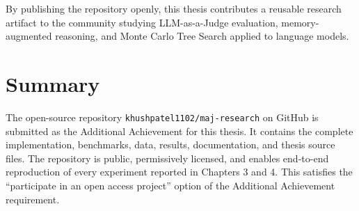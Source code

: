 \documentclass[12pt,a4paper]{article}
\begin{document}
By publishing the repository openly, this thesis contributes a reusable research artifact to the community studying LLM-as-a-Judge evaluation, memory-augmented reasoning, and Monte Carlo Tree Search applied to language models.

\section{Summary}

The open-source repository \texttt{khushpatel1102/maj-research} on GitHub is submitted as the Additional Achievement for this thesis. It contains the complete implementation, benchmarks, data, results, documentation, and thesis source files. The repository is public, permissively licensed, and enables end-to-end reproduction of every experiment reported in Chapters 3 and 4. This satisfies the ``participate in an open access project'' option of the Additional Achievement requirement.
\end{document}

